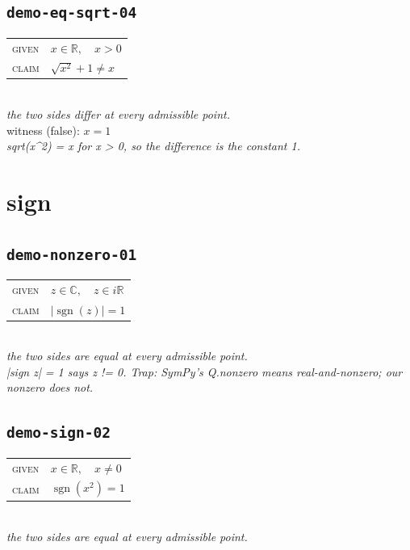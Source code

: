 \documentclass[11pt]{article}
\begin{document}
\subsection*{\texttt{demo-eq-sqrt-04}}
\begin{tabular}{@{}l@{\quad}l@{}}
\textsc{given} & $x \in \mathbb{R},\quad x > 0$ \\[4pt]
\textsc{claim} & $\displaystyle \sqrt{x^{2}} + 1 \neq x$ \\
\end{tabular}\\[2pt]
{\small\emph{the two sides differ at every admissible point.}}\\
{\footnotesize\color{gray}witness (false): $x = 1$}\\
\emph{sqrt(x\textasciicircum{}2) = x for x > 0, so the difference is the constant 1.}\\

\section*{sign}
\subsection*{\texttt{demo-nonzero-01}}
\begin{tabular}{@{}l@{\quad}l@{}}
\textsc{given} & $z \in \mathbb{C},\quad z \in i\mathbb{R}$ \\[4pt]
\textsc{claim} & $\displaystyle \left|\operatorname{sgn}\left(z\right)\right| = 1$ \\
\end{tabular}\\[2pt]
{\small\emph{the two sides are equal at every admissible point.}}\\
\emph{|sign z| = 1 says z != 0.  Trap: SymPy's Q.nonzero means real-and-nonzero; our nonzero does not.}\\

\subsection*{\texttt{demo-sign-02}}
\begin{tabular}{@{}l@{\quad}l@{}}
\textsc{given} & $x \in \mathbb{R},\quad x \neq 0$ \\[4pt]
\textsc{claim} & $\displaystyle \operatorname{sgn}\left(x^{2}\right) = 1$ \\
\end{tabular}\\[2pt]
{\small\emph{the two sides are equal at every admissible point.}}\\
\end{document}
